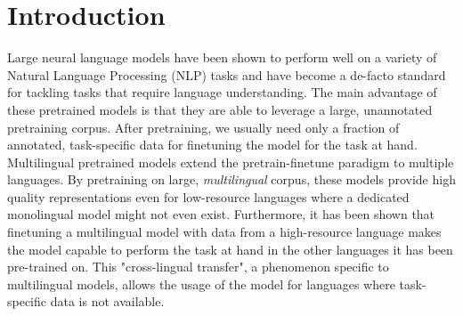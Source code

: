 
\chapter{Introduction}





Large neural language models have been shown to perform well on a variety of Natural Language Processing (NLP) tasks and have become a de-facto standard for tackling tasks that require language understanding. The main advantage of these pretrained models is that they are able to leverage a large, unannotated pretraining corpus. After pretraining, we usually need only a fraction of annotated, task-specific data for finetuning the model for the task at hand. \cite{devlin_bert_2019,radford_improving_nodate} Multilingual pretrained models extend the pretrain-finetune paradigm to multiple languages. By pretraining on large, \textit{multilingual} corpus, these models provide high quality representations even for low-resource languages where a dedicated monolingual model might not even exist. Furthermore, it has been shown that finetuning a multilingual model with data from a high-resource language makes the model capable to perform the task at hand in the other languages it has been pre-trained on. This "cross-lingual transfer", a phenomenon specific to multilingual models, allows the usage of the model for languages where task-specific data is not available. \cite{k_cross-lingual_2022,conneau_unsupervised_2020-1}

